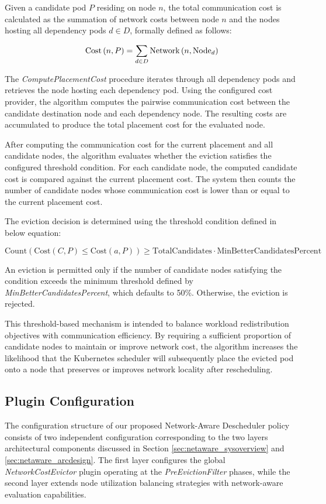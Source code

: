 Given a candidate pod $P$ residing on node $n$, the total communication cost is calculated as the summation of network costs between node $n$ and the nodes hosting all dependency pods $d \in D$, formally defined as follows:

\[
\text{Cost}\left(n, P\right) = \sum_{d \in D} \text{Network}\left(n, \text{Node}_{d}\right)
\]

The \textit{ComputePlacementCost} procedure iterates through all dependency pods and retrieves the node hosting each dependency pod. Using the configured cost provider, the algorithm computes the pairwise communication cost between the candidate destination node and each dependency node. The resulting costs are accumulated to produce the total placement cost for the evaluated node.

After computing the communication cost for the current placement and all candidate nodes, the algorithm evaluates whether the eviction satisfies the configured threshold condition. For each candidate node, the computed candidate cost is compared against the current placement cost. The system then counts the number of candidate nodes whose communication cost is lower than or equal to the current placement cost.

The eviction decision is determined using the threshold condition defined in below equation:

\[
{\text{Count}(\text{Cost}(C, P) \leq \text{Cost}(a, P))}
\geq
{\text{TotalCandidates}} \cdot \text{MinBetterCandidatesPercent}
\]

An eviction is permitted only if the number of candidate nodes satisfying the condition exceeds the minimum threshold defined by \textit{MinBetterCandidatesPercent}, which defaults to 50\%. Otherwise, the eviction is rejected.

This threshold-based mechanism is intended to balance workload redistribution objectives with communication efficiency. By requiring a sufficient proportion of candidate nodes to maintain or improve network cost, the algorithm increases the likelihood that the Kubernetes scheduler will subsequently place the evicted pod onto a node that preserves or improves network locality after rescheduling.

\subsection{Plugin Configuration}
\label{sec:netaware_config}
The configuration structure of our proposed Network-Aware Descheduler policy consists of two independent configuration corresponding to the two layers architectural components discussed in Section \ref{sec:netaware_sysoverview} and \ref{sec:netaware_arcdesign}. The first layer configures the global \textit{NetworkCostEvictor} plugin operating at the \textit{PreEvictionFilter} phases, while the second layer extends node utilization balancing strategies with network-aware evaluation capabilities.

